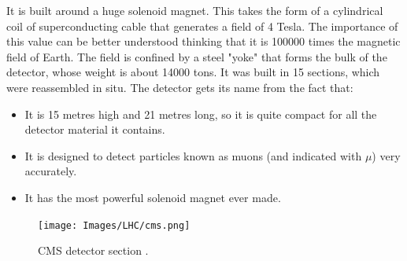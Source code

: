 It is built around a huge solenoid magnet. This takes the form of a cylindrical coil of superconducting cable that generates a field of 4 Tesla. The importance of this value can be better understood thinking that it is 100000 times the magnetic field of Earth. The field is confined by a steel "yoke" that forms the bulk of the detector, whose weight is about 14000 tons. It was built in 15 sections, which were reassembled in situ. The detector gets its name from the fact that:
\begin{itemize}
	\item It is 15 metres high and 21 metres long, so it is quite compact for all the detector material it contains.
	\item It is designed to detect particles known as muons (and indicated with $\mu$) very accurately.
	\item It has the most powerful solenoid magnet ever made.
\end{itemize}

\begin{figure}[t]
	\begin{center}
		\texttt{[image: Images/LHC/cms.png]}
		\caption{CMS detector section \cite{cms}.}
		\label{fig:CMS_SECTION}
	\end{center}
\end{figure}

